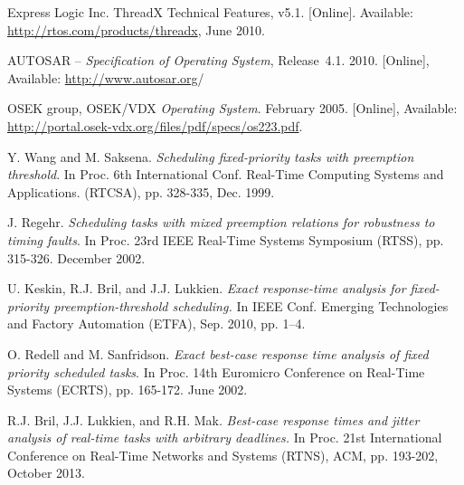 \documentclass[conference,compsoc]{IEEEtran}
\begin{document}

%
%
%
\begin{thebibliography}{1}

Express Logic Inc. ThreadX Technical Features, v5.1. [Online].
Available: \url{http://rtos.com/products/threadx}, June 2010.

{AUTOSAR} -- \textit{Specification of Operating System}, {Release}~4.1.
2010.
[Online], Available: \url{http://www.autosar.org}/


OSEK group,
{OSEK/VDX} \textit{Operating System}.
February 2005.
[Online], Available: \url{http://portal.osek-vdx.org/files/pdf/specs/os223.pdf}.

Y. Wang and M. Saksena.
\textit{Scheduling fixed-priority tasks with preemption threshold}.
In Proc. 6th International Conf. Real-Time Computing Systems and Applications. (RTCSA), pp. 328-335, Dec. 1999.

J. Regehr.
\textit{Scheduling tasks with mixed preemption relations for robustness to timing faults}.
In Proc. 23rd IEEE Real-Time Systems Symposium (RTSS),
pp. 315-326.
December 2002.

U. Keskin, R.J. Bril, and J.J. Lukkien.
\textit{Exact response-time analysis for fixed-priority preemption-threshold scheduling.} 
In IEEE Conf. Emerging Technologies and Factory Automation (ETFA), Sep. 2010, pp. 1–4.

O. Redell and M. Sanfridson.
\textit{Exact best-case response time analysis of fixed priority scheduled tasks}.
In Proc. 14th Euromicro Conference on Real-Time Systems (ECRTS),
pp. 165-172. June 2002.

R.J. Bril, J.J. Lukkien, and R.H. Mak.
\textit{Best-case response times and jitter analysis of real-time tasks with arbitrary deadlines.}
In Proc. 21st International Conference on Real-Time Networks and Systems (RTNS), ACM, pp. 193-202, October 2013.


\end{thebibliography}
\end{document}
